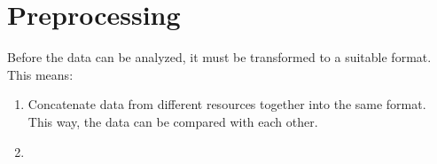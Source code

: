 
\section{Preprocessing}\label{sec:preprocessing}

Before the data can be analyzed, it must be transformed to a suitable format. This means:~\cite{article:markovmodel}

\begin{enumerate}
	\item Concatenate data from different resources together into the same format. This way, the data can be compared with each other.
	\item 
\end{enumerate}